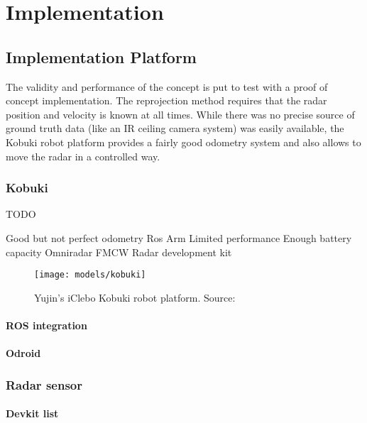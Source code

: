 
\chapter{Implementation}\label{implementation}

\section{Implementation Platform}\label{implementation-platform}

The validity and performance of the concept is put to test with a proof
of concept implementation. The reprojection method requires that the
radar position and velocity is known at all times. While there was no
precise source of ground truth data (like an IR ceiling camera system)
was easily available, the Kobuki robot platform provides a fairly good
odometry system and also allows to move the radar in a controlled way.

\subsection{Kobuki}\label{kobuki}

TODO

Good but not perfect odometry Ros Arm Limited performance Enough battery
capacity Omniradar FMCW Radar development kit

\begin{figure}[htp]
    \centering
    \label{fig:kobuki}
    \texttt{[image: models/kobuki]}
    \caption{Yujin's iClebo Kobuki robot platform. Source: \cite{DesignK2013}}
\end{figure}

\subsubsection{ROS integration}\label{ros-integration}

\subsubsection{Odroid}\label{odroid}

\subsection{Radar sensor}\label{radar-sensor}

\subsubsection{Devkit list}\label{devkit-list}


